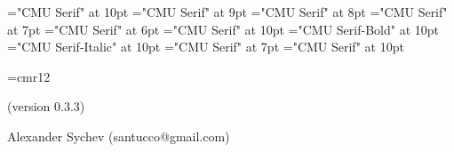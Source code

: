 \def\ver{0.3.3}
\font\tenrm="CMU Serif" at 10pt \tenrm
\font\ninerm="CMU Serif" at 9pt \ninerm
\font\eightrm="CMU Serif" at 8pt \eightrm 
\font\sevenrm="CMU Serif" at 7pt \sevenrm
\font\sixrm="CMU Serif" at 6pt \sixrm
\font\tentex="CMU Serif" at 10pt \tentex
\font\tenbf="CMU Serif-Bold" at 10pt \tenbf 
\font\tenit="CMU Serif-Italic" at 10pt \tenit 
\font\titlefont="CMU Serif" at 7pt   \titlefont 
\font\ttitlefont="CMU Serif" at 10pt  \ttitlefont

\def\As{\note{Также смотри секции}} %
\def\U{\note{Используется в секции}} %
\def\Us{\note{Используется в секциях}} %
\def\A{\note{Также смотри секцию}} %
\def\ET{ и~} %
\def\ETs{, и~} %
\def\fin{\par\vfill\eject %
  \ifpagesaved\null\vfill\eject\fi %
  \if L\lr\else\null\vfill\eject\fi %
  \parfillskip 0pt plus 1fil
  \def\grouptitle{НАЗВАНИЯ СЕКЦИЙ}
  \let\topsecno=\nullsec
  \message{Названия секций:}
  \output={\normaloutput\page\lheader\rheader}
  \setpage
  \def\note##1##2.{\quad{\eightrm##1~\ifacro{\pdfnote##2.}\else{##2}\fi.}}
  \def\Q{\note{Расположено в секции}} %
  \def\Qs{\note{Расположено в секциях}} %
  \def\U{\note{Используется в секции}} %
  \def\Us{\note{Используется в секциях}} %
  \def\I{\par\hangindent 2em}\let\*=*
  \def\outsecname{Названия секций}
  \ifacro \let\Xpdf\X
  \ifpdftex \makebookmarks \pdfdest name {NOS} fitb
    \pdfoutline goto name {NOS} count -\secno {\outsecname}
    \def\X##1:##2\X{\Xpdf##1:##2\X \firstsecno##1.%
      {\toksF={}\makeoutlinetoks##2\outlinedone\outlinedone}%
      \pdfoutline goto num \the\toksA \expandafter{\the\toksE}}
  \else\ifpdf
    \special{pdf: outline -1 << /Title (\outsecname)
      /Dest [ @thispage /FitH @ypos ] >>}
    \def\X##1:##2\X{\Xpdf##1:##2\X \firstsecno##1.%
      {\toksF={}\makeoutlinetoks##2\outlinedone\outlinedone}%
      \special{pdf: outline 0 << /Title (\the\toksE)
        /A << /S /GoTo /D (\romannumeral\the\toksA) >> >>}}
  \fi\fi\fi
  \readsections}


\font\authorfont=cmr12
 \titletrue\eject
\null\vfill
\centerline{\stitle}
\vskip 10pt\centerline{(version \ver)}
\vskip 24pt
\centerline{\authorfont Alexander Sychev (santucco@gmail.com)}
\vfill

